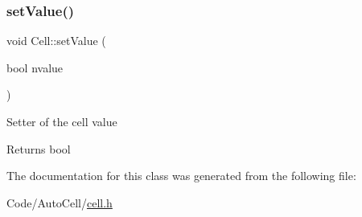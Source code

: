 \subsubsection{\texorpdfstring{set\+Value()}{setValue()}}
{\footnotesize\ttfamily void Cell\+::set\+Value (\begin{DoxyParamCaption}\item[{bool}]{nvalue }\end{DoxyParamCaption})\hspace{0.3cm}{\ttfamily [inline]}}

Setter of the cell value

\begin{DoxyReturn}{Returns}
bool 
\end{DoxyReturn}


The documentation for this class was generated from the following file\+:\begin{DoxyCompactItemize}
\item 
Code/\+Auto\+Cell/\mbox{\hyperlink{cell_8h}{cell.\+h}}\end{DoxyCompactItemize}
